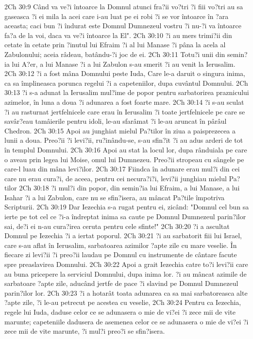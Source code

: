 2Ch 30:9  Când va ve?i întoarce la Domnul atunci fra?ii vo?tri ?i fiii vo?tri au sa gaseasca ?i ei mila la acei care i-au luat pe ei robi ?i se vor întoarce în ?ara aceasta; caci bun ?i îndurat este Domnul Dumnezeul vostru ?i nu-?i va întoarce fa?a de la voi, daca va ve?i întoarce la El".
2Ch 30:10  ?i au mers trimi?ii din cetate în cetate prin ?inutul lui Efraim ?i al lui Manase ?i pâna la acela al Zabulonului; aceia râdeau, batându-?i joc de ei.
2Ch 30:11  Totu?i unii din semin?ia lui A?er, a lui Manase ?i a lui Zabulon s-au smerit ?i au venit la Ierusalim.
2Ch 30:12  ?i a fost mâna Domnului peste Iuda, Care le-a daruit o singura inima, ca sa împlineasca porunca regelui ?i a capeteniilor, dupa cuvântul Domnului.
2Ch 30:13  ?i s-a adunat la Ierusalim mul?ime de popor pentru sarbatorirea praznicului azimelor, în luna a doua ?i adunarea a fost foarte mare.
2Ch 30:14  ?i s-au sculat ?i au rasturnat jertfelnicele care erau în Ierusalim ?i toate jertfelnicele pe care se savâr?eau tamâierile pentru idoli, le-au sfarâmat ?i le-au aruncat în pârâul Chedron.
2Ch 30:15  Apoi au junghiat mielul Pa?tilor în ziua a paisprezecea a lunii a doua. Preo?ii ?i levi?ii, ru?inându-se, s-au sfin?it ?i au adus arderi de tot în templul Domnului.
2Ch 30:16  Apoi au stat la locul lor, dupa rânduiala pe care o aveau prin legea lui Moise, omul lui Dumnezeu. Preo?ii stropeau cu sângele pe care-l luau din mâna levi?ilor.
2Ch 30:17  Fiindca în adunare erau mul?i din cei care nu erau cura?i, de aceea, pentru cei necura?i?i, levi?ii junghiau mielul Pa?tilor
2Ch 30:18  ?i mul?i din popor, din semin?ia lui Efraim, a lui Manase, a lui Isahar ?i a lui Zabulon, care nu se sfin?isera, au mâncat Pa?tile împotriva Scripturii.
2Ch 30:19  Dar Iezechia s-a rugat pentru ei, zicând: "Domnul cel bun sa ierte pe tot cel ce ?i-a îndreptat inima sa caute pe Domnul Dumnezeul parin?ilor sai, de?i ei n-au cura?irea ceruta pentru cele sfinte!"
2Ch 30:20  ?i a ascultat Domnul pe Iezechia ?i a iertat poporul.
2Ch 30:21  ?i au sarbatorit fiii lui Israel, care s-au aflat în Ierusalim, sarbatoarea azimilor ?apte zile cu mare veselie. În fiecare zi levi?ii ?i preo?ii laudau pe Domnul cu instrumente de cântare facute spre preaslavirea Domnului.
2Ch 30:22  Apoi a grait Iezechia catre to?i levi?ii care au buna pricepere la serviciul Domnului, dupa inima lor. ?i au mâncat azimile de sarbatoare ?apte zile, aducând jertfe de pace ?i slavind pe Domnul Dumnezeul parin?ilor lor.
2Ch 30:23  ?i a hotarât toata adunarea ca sa mai sarbatoreasca alte ?apte zile, ?i le-au petrecut pe acestea cu veselie,
2Ch 30:24  Pentru ca Iezechia, regele lui Iuda, daduse celor ce se adunasera o mie de vi?ei ?i zece mii de vite marunte; capeteniile dadusera de asemenea celor ce se adunasera o mie de vi?ei ?i zece mii de vite marunte, ?i mul?i preo?i se sfin?isera.
